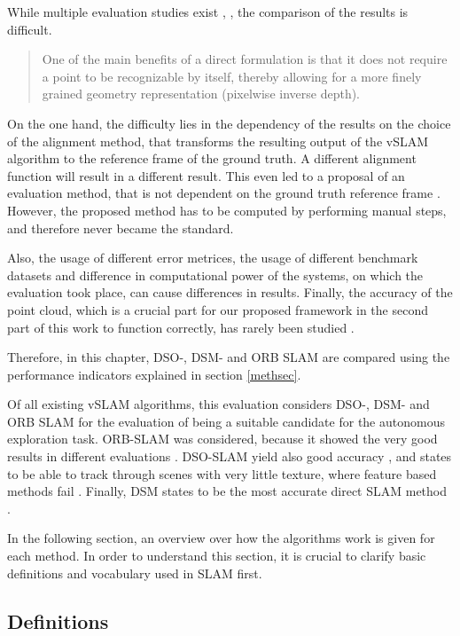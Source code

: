 While multiple evaluation studies exist \cite{eval1} \cite{eval2} \cite{pq} \cite{orb}, \cite{dso}, the comparison of the results is difficult. 

  \begin{quote}
	One of the main benefits of a direct formulation is that it
	does not require a point to be recognizable by itself, thereby
	allowing for a more finely grained geometry representation (pixelwise inverse depth). \cite{align1}
  \end{quote}

On the one hand, the difficulty lies in the dependency of the results on the choice of the 
alignment method, that transforms the resulting output of the vSLAM algorithm to the reference frame of the ground truth. 
A different alignment function will result in a different result. This even led to a proposal of an evaluation method, that is not dependent on the ground truth reference 
frame \cite{align1}. However, the proposed method has to be computed by performing manual steps, 
and therefore never became the standard.

 Also, the usage of different error metrices, the usage of different benchmark datasets and difference in computational power of the systems,
 on which the evaluation took place, can cause differences in results. 
Finally, the accuracy of the point cloud, which is a crucial part for our proposed framework in the second part of this work to function correctly, has rarely been studied \cite{pq}. 

Therefore, in this chapter, DSO-, DSM- and ORB SLAM are compared using the performance indicators explained in section \ref{methsec}. 


Of all existing vSLAM algorithms, this evaluation considers DSO-, DSM- and ORB SLAM for the evaluation of being a suitable candidate for the autonomous exploration task.
ORB-SLAM was considered, because it showed the very good results in different evaluations \cite{eval1} \cite{eval3}. 
DSO-SLAM yield also good accuracy \cite{eval3}, and states to be able to track through scenes with very little texture, where feature based methods fail \cite{dso}.
Finally, DSM states to be the most accurate direct SLAM method \cite{dsm}.   

In the following section, an overview over how the algorithms work is given for each method. In order to understand this section, it is crucial to clarify basic definitions 
and vocabulary used in SLAM first. 

	\subsection{Definitions}
		
